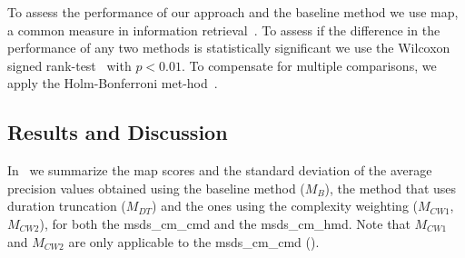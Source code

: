 To assess the performance of our approach and the baseline method we use \acrfull{map}, a common measure in information retrieval~\citep{manning2008introduction}. To assess if the difference in the performance of any two methods is statistically significant we use the Wilcoxon signed rank-test~\citep{wilcoxon1945individual} with $p < 0.01$. To compensate for multiple comparisons, we apply the Holm-Bonferroni met-hod~\citep{holm1979simple}.


\subsection{Results and Discussion}
\label{sec:patterns_improving_similarity_results_and_discussion}


In~ we summarize the \gls{map} scores and the standard deviation of the average precision values obtained using the baseline method ($M_{B}$), the method that uses duration truncation ($M_{DT}$) and the ones using the complexity weighting ($M_{CW1}$, $M_{CW2}$), for both the \acrshort{msds_cm_cmd} and the \acrshort{msds_cm_hmd}. Note that $M_{CW1}$ and $M_{CW2}$ are only applicable to the \acrshort{msds_cm_cmd} ().


